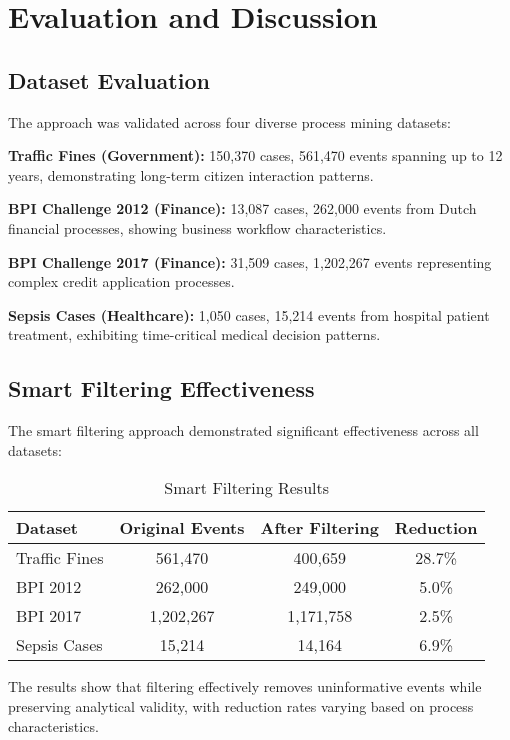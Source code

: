 \documentclass[11pt,a4paper]{article}
\begin{document}
\section{Evaluation and Discussion}
\label{sec:evaluation}

\subsection{Dataset Evaluation}

The approach was validated across four diverse process mining datasets:

\textbf{Traffic Fines (Government):} 150,370 cases, 561,470 events spanning up to 12 years, demonstrating long-term citizen interaction patterns.

\textbf{BPI Challenge 2012 (Finance):} 13,087 cases, 262,000 events from Dutch financial processes, showing business workflow characteristics.

\textbf{BPI Challenge 2017 (Finance):} 31,509 cases, 1,202,267 events representing complex credit application processes.

\textbf{Sepsis Cases (Healthcare):} 1,050 cases, 15,214 events from hospital patient treatment, exhibiting time-critical medical decision patterns.

\subsection{Smart Filtering Effectiveness}

The smart filtering approach demonstrated significant effectiveness across all datasets:

\begin{table}[H]
\centering
\caption{Smart Filtering Results}
\begin{tabular}{@{}lccc@{}}
\toprule
Dataset & Original Events & After Filtering & Reduction \\
\midrule
Traffic Fines & 561,470 & 400,659 & 28.7\% \\
BPI 2012 & 262,000 & 249,000 & 5.0\% \\
BPI 2017 & 1,202,267 & 1,171,758 & 2.5\% \\
Sepsis Cases & 15,214 & 14,164 & 6.9\% \\
\bottomrule
\end{tabular}
\end{table}

The results show that filtering effectively removes uninformative events while preserving analytical validity, with reduction rates varying based on process characteristics.
\end{document}
